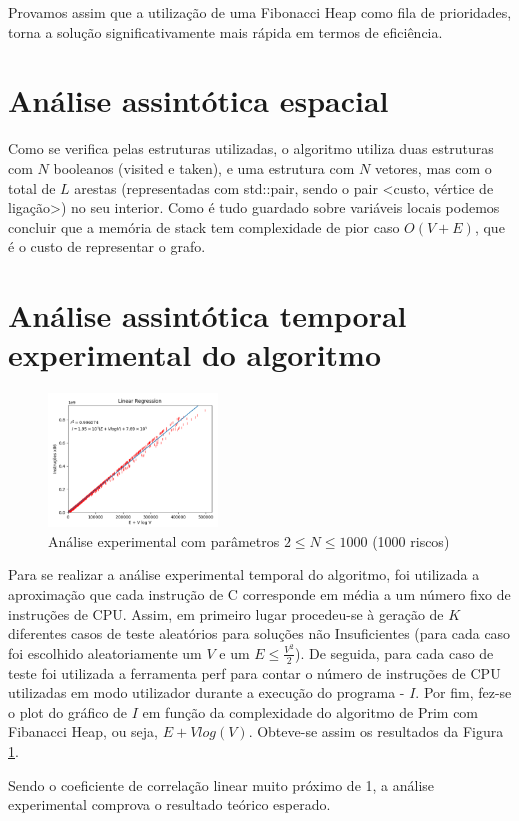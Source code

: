 \documentclass{scrartcl}
\begin{document}
Provamos assim que a utilização de uma Fibonacci Heap como fila de prioridades, torna a solução significativamente mais rápida em termos de eficiência.


\section*{Análise assintótica espacial}
Como se verifica pelas estruturas utilizadas, o algoritmo utiliza duas estruturas com $N$ booleanos (visited e taken), e uma estrutura com $N$ vetores, mas com o total de $L$ arestas (representadas com std::pair, sendo o pair <custo, vértice de ligação>) no seu interior. Como é tudo guardado sobre variáveis locais podemos concluir que a memória de stack tem complexidade de pior caso $O(V+E)$, que é o custo de representar o grafo.


\section*{Análise assintótica temporal experimental do algoritmo}
\begin{figure}
	\centering
	\includegraphics[width=0.4\textwidth]{img/analise.png}
	\caption{Análise experimental com parâmetros $2 \le N \le 1000 $ (1000 riscos)}
	\label{fig:analexp}
\end{figure}
Para se realizar a análise experimental temporal do algoritmo, foi utilizada a aproximação que cada instrução de C corresponde em média a um número fixo de instruções de CPU. Assim, em primeiro lugar procedeu-se à geração de $K$ diferentes casos de teste aleatórios para soluções não Insuficientes (para cada caso foi escolhido aleatoriamente um $V$ e um $E\le \frac{V^2}{2}$). De seguida, para cada caso de teste foi utilizada a ferramenta perf para contar o número de instruções de CPU utilizadas em modo utilizador durante a execução do programa - $I$. Por fim, fez-se o plot do gráfico de $I$ em função da complexidade do algoritmo de Prim com Fibanacci Heap, ou seja, $E + V log (V)$. Obteve-se assim os resultados da Figura \ref{fig:analexp}.\par
Sendo o coeficiente de correlação linear muito próximo de 1, a análise experimental comprova o resultado teórico esperado.


\end{document}
